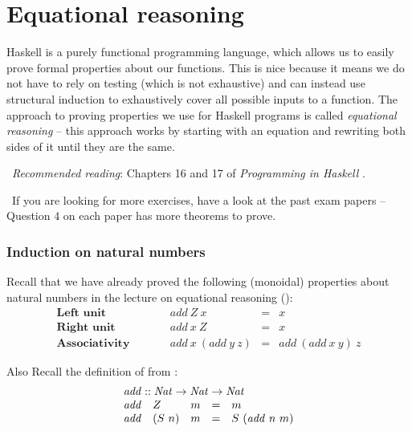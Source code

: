 \section{Equational reasoning}

Haskell is a purely functional programming language, which allows us to easily prove formal properties about our functions. This is nice because it means we do not have to rely on testing (which is not exhaustive) and can instead use structural induction to exhaustively cover all possible inputs to a function. The approach to proving properties we use for Haskell programs is called \emph{equational reasoning} -- this approach works by starting with an equation and rewriting both sides of it until they are the same. 

\makebox[0.5cm]{\faBook}~\emph{Recommended reading}: Chapters 16 and 17 of \emph{Programming in Haskell} \citep{hutton2016programming}.

\makebox[0.5cm]{\faLightbulbO}~If you are looking for more exercises, have a look at the past exam papers -- Question 4 on each paper has more theorems to prove.

\subsubsection{Induction on natural numbers}

Recall that we have already proved the following (monoidal) properties about natural numbers in the lecture on equational reasoning ():
\begin{displaymath}
\begin{array}{lcrcl}
\textbf{Left unit} &\qquad & \mathit{add}~Z~x & = & x \\
\textbf{Right unit} &\qquad & \mathit{add}~x~Z & = & x \\
\textbf{Associativity} & \qquad & \mathit{add}~x~(\mathit{add}~y~z) & = & \mathit{add}~(\mathit{add}~x~y)~z 
\end{array}
\end{displaymath}

Also Recall the definition of  from :
\begin{displaymath}
\begin{array}{lllcl}
\multicolumn{5}{l}{\mathit{add} :: \mathit{Nat} \to \mathit{Nat} \to \mathit{Nat}} \\
\mathit{add} & Z & m & = & m \\
\mathit{add} & (S~n) & m & = & S~(\mathit{add}~n~m)
\end{array}
\end{displaymath}

